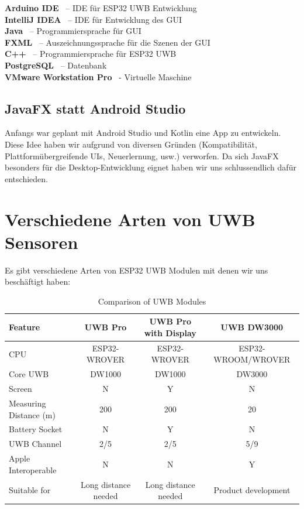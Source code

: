 \textbf{Arduino IDE} \ – IDE für ESP32 UWB Entwicklung \\
\textbf{IntelliJ IDEA} \ – IDE für Entwicklung des GUI \\
\textbf{Java} \ – Programmiersprache für GUI \\
\textbf{FXML} \ – Auszeichnungssprache für die Szenen der GUI \\
\textbf{C++} \ – Programmiersprache für ESP32 UWB \\
\textbf{PostgreSQL} \ – Datenbank \\
\textbf{VMware Workstation Pro} \ - Virtuelle Maschine

\subsection{JavaFX statt Android Studio}
Anfangs war geplant mit Android Studio und Kotlin eine App zu entwickeln. Diese Idee haben wir aufgrund von diversen Gründen (Kompatibilität, Plattformübergreifende UIs, Neuerlernung, usw.) verworfen. Da sich JavaFX besonders für die Desktop-Entwicklung eignet haben wir uns schlussendlich dafür entschieden.

\section{Verschiedene Arten von UWB Sensoren}

Es gibt verschiedene Arten von ESP32 UWB Modulen mit denen wir uns beschäftigt haben:

\begin{table}[h]
	\centering
	\small
	\begin{tabular}{|l|c|c|c|}
		\hline
		\textbf{Feature} & \textbf{UWB Pro} & \textbf{UWB Pro with Display} & \textbf{UWB DW3000} \\
		\hline
		CPU & ESP32-WROVER & ESP32-WROVER & ESP32-WROOM/WROVER \\
		\hline
		Core UWB & DW1000 & DW1000 & DW3000 \\
		\hline
		Screen & N & Y & N \\
		\hline
		Measuring Distance (m) & 200 & 200 & 20 \\
		\hline
		Battery Socket & N & Y & N \\
		\hline
		UWB Channel & 2/5 & 2/5 & 5/9 \\
		\hline
		Apple Interoperable & N & N & Y \\
		\hline
		Suitable for & Long distance needed & Long distance needed & Product development \\
		\hline
	\end{tabular}
	\caption{Comparison of UWB Modules}
	\label{tab:uwb_comparison}
	\parencite{ArtenSensorn}
\end{table}

